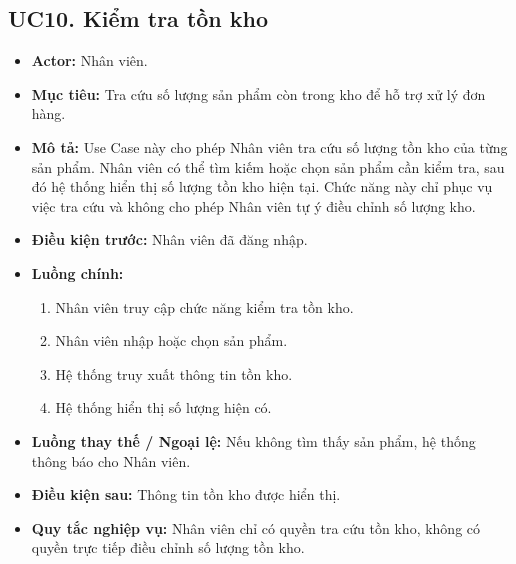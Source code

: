 \documentclass[12pt,a4paper]{article}
\begin{document}

\subsection{UC10. Kiểm tra tồn kho}

\begin{itemize}

 \item \textbf{Actor:} Nhân viên.

 \item \textbf{Mục tiêu:} Tra cứu số lượng sản phẩm còn trong kho để hỗ trợ xử lý đơn hàng.

 \item \textbf{Mô tả:} Use Case này cho phép Nhân viên tra cứu số lượng tồn kho của từng sản phẩm. Nhân viên có thể tìm kiếm hoặc chọn sản phẩm cần kiểm tra, sau đó hệ thống hiển thị số lượng tồn kho hiện tại. Chức năng này chỉ phục vụ việc tra cứu và không cho phép Nhân viên tự ý điều chỉnh số lượng kho.

 \item \textbf{Điều kiện trước:} Nhân viên đã đăng nhập.

 \item \textbf{Luồng chính:}

 \begin{enumerate}

  \item Nhân viên truy cập chức năng kiểm tra tồn kho.

  \item Nhân viên nhập hoặc chọn sản phẩm.

  \item Hệ thống truy xuất thông tin tồn kho.

  \item Hệ thống hiển thị số lượng hiện có.

 \end{enumerate}

 \item \textbf{Luồng thay thế / Ngoại lệ:} Nếu không tìm thấy sản phẩm, hệ thống thông báo cho Nhân viên.

 \item \textbf{Điều kiện sau:} Thông tin tồn kho được hiển thị.

 \item \textbf{Quy tắc nghiệp vụ:} Nhân viên chỉ có quyền tra cứu tồn kho, không có quyền trực tiếp điều chỉnh số lượng tồn kho.

\end{itemize}
\end{document}
